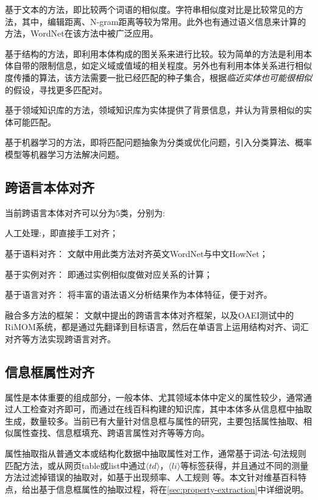 {\heiti 基于文本的方法}，即比较两个词语的相似度。字符串相似度对比是比较常见的方法，其中，编辑距离、N-gram距离等较为常用。此外也有通过语义信息来计算的方法，WordNet\cite{miller1995wordnet}在该方法中被广泛应用。

{\heiti 基于结构的方法\cite{hu2008matching}}，即利用本体构成的图关系来进行比较。较为简单的方法是利用本体自带的限制信息，如定义域或值域的相关程度。另外也有利用本体关系进行相似度传播的算法，该方法需要一批已经匹配的种子集合，根据\textit{临近实体也可能很相似}的假设，寻找更多匹配对。

{\heiti 基于领域知识库的方法\cite{ponzetto2009large,gligorov2007using}}，领域知识库为实体提供了背景信息，并认为背景相似的实体可能匹配。

{\heiti 基于机器学习的方法\cite{niepert2010probabilistic,albagli2012markov}}，即将匹配问题抽象为分类或优化问题，引入分类算法、概率模型等机器学习方法解决问题。


\subsection{跨语言本体对齐}
当前跨语言本体对齐可以分为5类\cite{}，分别为:

{\heiti 人工处理\cite{}:}，即直接手工对齐；

{\heiti 基于语料对齐：} 文献\cite{}中用此类方法对齐英文WordNet与中文HowNet；

{\heiti 基于实例对齐：} 即通过实例相似度做对应关系的计算\cite{}；

{\heiti 基于语言对齐：} 将丰富的语法语义分析结果作为本体特征，便于对齐。

{\heiti 融合多方法的框架：} 文献\cite{}中提出的跨语言本体对齐框架，以及OAEI测试中的RiMOM系统\cite{}，都是通过先翻译到目标语言，然后在单语言上运用结构对齐、词汇对齐等方法实现跨语言对齐。

\subsection{信息框属性对齐}
\label{sec:property-research}
属性是本体重要的组成部分，一般本体、尤其领域本体中定义的属性较少，通常通过人工检查对齐即可\cite{wang:movie}，而通过在线百科构建的知识库，其中本体多从信息框中抽取生成，数量较多。当前已有大量针对信息框与属性的研究，主要包括属性抽取、相似属性查找、信息框填充、跨语言属性对齐等等方向。

{\heiti 属性抽取}指从普通文本或结构化数据中抽取属性对工作，通常基于词法-句法规则匹配方法\cite{pacsca2007role,lee2013attribute}，或从网页table或list中通过$\langle td\rangle$，$\langle li\rangle$等标签获得\cite{crestan2010web}，并且通过不同的测量方法过滤掉错误的抽取对，如基于出现频率\cite{pacsca2007role}、人工规则\cite{lee2013attribute} 等。本文针对维基百科特点，给出基于信息框属性的抽取过程，将在\ref{sec:property-extraction}中详细说明。

